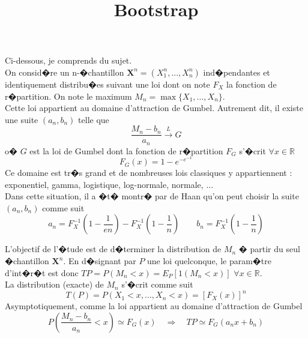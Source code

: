 \documentclass{article}
\title{Bootstrap}
\begin{document}
\maketitle

\noindent Ci-dessous, je comprends du sujet.\\

\noindent On consid�re un n-�chantillon $\boldsymbol{X}^n = (X^n_1, ..., X^n_n)$ ind�pendantes et identiquement distribu�es suivant une loi dont on note $F_X$ la fonction de r�partition. On note le maximum $M_n = \max \{X_1, ..., X_n\}$.\\

\noindent Cette loi appartient au domaine d'attraction de Gumbel. Autrement dit, il existe une suite $(a_n,b_n)$ telle que 
\begin{equation}
\frac{M_n - b_n}{a_n} \overset{L}{\longrightarrow} G
\end{equation}
o� $G$ est la loi de Gumbel dont la fonction de r�partition $F_G$ s'�crit $\forall x \in \mathbb{R}$
\begin{equation}
F_G(x) = 1 - e^{-e^{-x}}
\end{equation}
Ce domaine est tr�s grand et de nombreuses lois classiques y appartiennent : exponentiel, gamma, logistique, log-normale, normale, ...\\

\noindent Dans cette situation, il a �t� montr� par de Haan qu'on peut choisir la suite $(a_n, b_n)$ comme suit
\begin{equation}
a_n = F_X^{-1}\left(1-\frac{1}{e n}\right) - F_X^{-1}\left(1- \frac{1}{n}\right) \qquad b_n = F_X^{-1}\left(1- \frac{1}{n}\right)
\end{equation}

\noindent L'objectif de l'�tude est de d�terminer la distribution de $M_n$ � partir du seul �chantillon $\boldsymbol{X}^n$. En d�signant par $P$ une loi quelconque, le param�tre d'int�r�t est donc $TP = P(M_n < x) = E_P[1(M_n < x)]$ $\forall x \in \mathbb{R}$.\\

\noindent La distribution (exacte) de $M_n$ s'�crit comme suit
\begin{equation}
T(P) = P(X_1 < x, ..., X_n < x) = [F_X(x)]^n
\end{equation}
Asymptotiquement, comme la loi appartient au domaine d'attraction de Gumbel
\begin{equation}
P\left(\frac{M_n - b_n}{a_n} < x\right) \simeq F_G(x) \quad \Longrightarrow \quad TP \simeq F_G(a_n x + b_n)
\end{equation}
\end{document}
